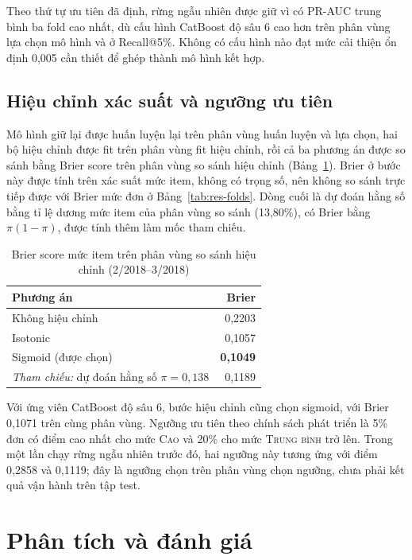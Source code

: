 Theo thứ tự ưu tiên đã định, rừng ngẫu nhiên được giữ vì có PR-AUC trung bình ba fold cao nhất, dù cấu hình CatBoost độ sâu 6 cao hơn trên phân vùng lựa chọn mô hình và ở Recall@5\%. Không có cấu hình nào đạt mức cải thiện ổn định 0,005 cần thiết để ghép thành mô hình kết hợp.

\subsection{Hiệu chỉnh xác suất và ngưỡng ưu tiên}\label{subsec:tab-calibration}

Mô hình giữ lại được huấn luyện lại trên phân vùng huấn luyện và lựa chọn, hai bộ hiệu chỉnh được fit trên phân vùng fit hiệu chỉnh, rồi cả ba phương án được so sánh bằng Brier score trên phân vùng so sánh hiệu chỉnh (Bảng~\ref{tab:res-calibration}). Brier ở bước này được tính trên xác suất mức item, không có trọng số, nên không so sánh trực tiếp được với Brier mức đơn ở Bảng~\ref{tab:res-folds}. Dòng cuối là dự đoán hằng số bằng tỉ lệ dương mức item của phân vùng so sánh (13,80\%), có Brier bằng $\pi(1-\pi)$, được tính thêm làm mốc tham chiếu.

\begin{table}[htbp]\centering\small
\caption{Brier score mức item trên phân vùng so sánh hiệu chỉnh (2/2018--3/2018)}\label{tab:res-calibration}
\begin{tabular}{lr}
\toprule
Phương án & Brier \\
\midrule
Không hiệu chỉnh & 0,2203 \\
Isotonic & 0,1057 \\
Sigmoid (được chọn) & \textbf{0,1049} \\
\midrule
\emph{Tham chiếu:} dự đoán hằng số $\pi = 0{,}138$ & 0,1189 \\
\bottomrule
\end{tabular}
\end{table}

Với ứng viên CatBoost độ sâu 6, bước hiệu chỉnh cũng chọn sigmoid, với Brier 0,1071 trên cùng phân vùng. Ngưỡng ưu tiên theo chính sách phát triển là 5\% đơn có điểm cao nhất cho mức \textsc{Cao} và 20\% cho mức \textsc{Trung bình} trở lên. Trong một lần chạy rừng ngẫu nhiên trước đó, hai ngưỡng này tương ứng với điểm 0,2858 và 0,1119; đây là ngưỡng chọn trên phân vùng chọn ngưỡng, chưa phải kết quả vận hành trên tập test.

\section{Phân tích và đánh giá}\label{sec:results-analysis}

